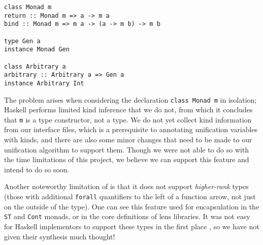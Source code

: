 {
\smallskip
\begin{verbatim}
class Monad m
return :: Monad m => a -> m a
bind :: Monad m => m a -> (a -> m b) -> m b

type Gen a
instance Monad Gen

class Arbitrary a
arbitrary :: Arbitrary a => Gen a
instance Arbitrary Int
\end{verbatim}
\smallskip
}

The problem arises when considering the declaration \texttt{class Monad m} in isolation; Haskell performs limited kind inference that we do not, from which it concludes that \texttt{m} is a type constructor, not a type. We do not yet collect kind information from our interface files, which is a prerequisite to annotating unification variables with kinds, and there are also some minor changes that need to be made to our unification algorithm to support them. Though we were not able to do so with the time limitations of this project, we believe we can support this feature and intend to do so soon.

Another noteworthy limitation of \Rulecheck is that it does not support \textit{higher-rank} types (those with additional \texttt{forall} quantifiers to the left of a function arrow, not just on the outside of the type). One can see this feature used for encapsulation in the \texttt{ST} and \texttt{Cont} monads, or in the core definitions of lens libraries. It was not easy for Haskell implementors to support these types in the first place \cite{jones2007practical}, so we have not given their synthesis much thought!
